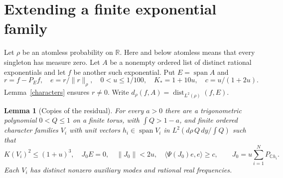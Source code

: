 \documentclass[reqno,a4paper,12pt]{amsart}
\newtheorem{lemma}[theorem]{Lemma}
\newcommand{\R}{\mathbb R}
\newcommand{\C}{\mathbb C}
\newcommand{\spn}{\operatorname{span}}
\newcommand{\dist}{\operatorname{dist}}
\newcommand{\ip}[2]{\langle #1,#2\rangle}
\begin{document}
\section{Extending a finite exponential family}
Let $\rho$ be an atomless probability on $\R$. Here and below atomless
means that every singleton has measure zero.
Let $A$ be a nonempty ordered list of distinct rational exponentials
and let $f$ be another such exponential. Put $E=\spn A$ and
\[
 r=f-P_Ef,\quad e=r/\|r\|_\rho,\quad
 0<u\le1/100,\quad K_*=1+10u,\quad c=u/(1+2u).
\]
Lemma~\ref{characters} ensures $r\ne0$.
Write $d_\rho(f,A)=\dist_{L^2(\rho)}(f,E)$.

\begin{lemma}[Copies of the residual]\label{copies}
For every $a>0$ there are a trigonometric polynomial $0<Q\le1$ on a
finite torus, with $\int Q>1-a$, and finite ordered character families
$V_i$ with unit vectors $h_i\in\spn V_i$ in
$L^2(d\rho\,Q\,dy/\int Q)$ such that
\[
 K(V_i)^2\le(1+u)^3,\quad J_0E=0,\quad
 \|J_0\|<2u,\quad \ip{\Psi(J_0)e}{e}\ge c,
 \qquad J_0=u\sum_{i=1}^NP_{\C h_i}.
\]
Each $V_i$ has distinct nonzero auxiliary modes and rational real frequencies.
\end{lemma}
\end{document}
